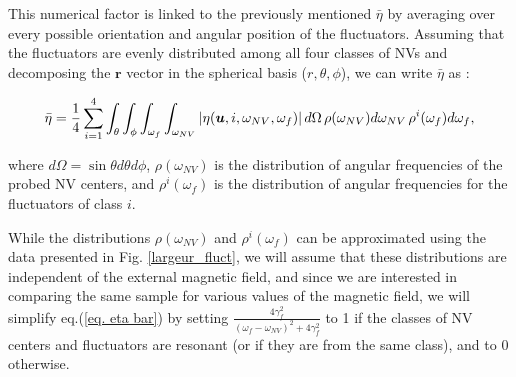 \documentclass[preprintnumbers,amsmath,amssymb,onecolumn,12pt]{revtex4-2}\usepackage{graphicx}%
\begin{document}
This numerical factor is linked to the previously mentioned $\bar \eta$ by averaging over every possible orientation and angular position of the fluctuators. Assuming that the fluctuators are evenly distributed among all four classes of NVs and decomposing the $\bm r$ vector in the spherical basis ($r, \theta, \phi$), we can write $\bar \eta$ as :

\begin{equation}
\label{eq. eta bar}
\bar \eta =\frac{1}{4} \sum_{i=1}^4 \int_\theta \int_\phi  \int_{\omega_f} \int_{\omega_{NV}}   \abs{\eta(\bm u,i,\omega_{NV},\omega_f)}\, d\Omega\, \rho(\omega_{NV}) d\omega_{NV}\, \rho^i(\omega_f) d\omega_f ,
\end{equation}

where $d\Omega=\sin \theta d\theta d\phi$, $\rho(\omega_{NV})$ is the distribution of angular frequencies of the probed NV centers, and  $\rho^i(\omega_f)$ is the distribution of angular frequencies  for the fluctuators of class $i$.

While the distributions $\rho(\omega_{NV})$ and $\rho^i(\omega_f)$ can be approximated using the data presented in Fig. \ref{largeur_fluct}, we will assume that these distributions are independent of the external magnetic field, and since we are interested in comparing the same sample for various values of the magnetic field, we will simplify eq.(\ref{eq. eta bar}) by setting $\frac{4\gamma_f^2}{(\omega_f - \omega_{NV})^2+4\gamma_f^2}$ to 1 if the classes of NV centers and fluctuators are resonant (or if they are from the same class), and to 0 otherwise.
\end{document}
